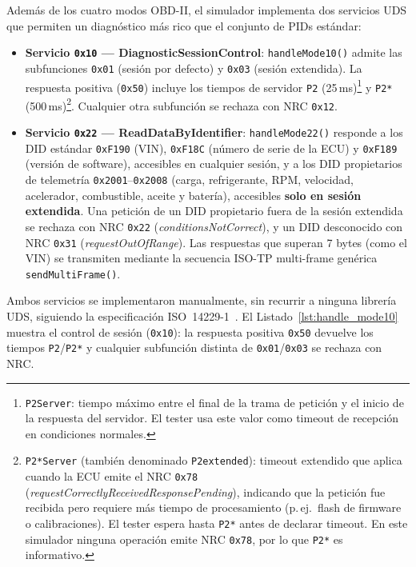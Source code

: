 Además de los cuatro modos OBD-II, el simulador implementa dos servicios UDS que permiten un diagnóstico más rico que el conjunto de PIDs estándar:

\begin{itemize}
    \item \textbf{Servicio \texttt{0x10} — DiagnosticSessionControl}: \texttt{handleMode10()} admite las subfunciones \texttt{0x01} (sesión por defecto) y \texttt{0x03} (sesión extendida). La respuesta positiva (\texttt{0x50}) incluye los tiempos de servidor \texttt{P2} (25\,ms)\footnote{\texttt{P2Server}: tiempo máximo entre el final de la trama de petición y el inicio de la respuesta del servidor. El tester usa este valor como timeout de recepción en condiciones normales.} y \texttt{P2*} (500\,ms)\footnote{\texttt{P2*Server} (también denominado \texttt{P2extended}): timeout extendido que aplica cuando la ECU emite el NRC \texttt{0x78} (\textit{requestCorrectlyReceivedResponsePending}), indicando que la petición fue recibida pero requiere más tiempo de procesamiento (p.\,ej.\ flash de firmware o calibraciones). El tester espera hasta \texttt{P2*} antes de declarar timeout. En este simulador ninguna operación emite NRC \texttt{0x78}, por lo que \texttt{P2*} es informativo.}. Cualquier otra subfunción se rechaza con NRC \texttt{0x12}.

    \item \textbf{Servicio \texttt{0x22} — ReadDataByIdentifier}: \texttt{handleMode22()} responde a los DID estándar \texttt{0xF190} (VIN), \texttt{0xF18C} (número de serie de la ECU) y \texttt{0xF189} (versión de software), accesibles en cualquier sesión, y a los DID propietarios de telemetría \texttt{0x2001}--\texttt{0x2008} (carga, refrigerante, RPM, velocidad, acelerador, combustible, aceite y batería), accesibles \textbf{solo en sesión extendida}. Una petición de un DID propietario fuera de la sesión extendida se rechaza con NRC \texttt{0x22} (\textit{conditionsNotCorrect}), y un DID desconocido con NRC \texttt{0x31} (\textit{requestOutOfRange}). Las respuestas que superan 7 bytes (como el VIN) se transmiten mediante la secuencia ISO-TP multi-frame genérica \texttt{sendMultiFrame()}.
\end{itemize}

Ambos servicios se implementaron manualmente, sin recurrir a ninguna librería UDS, siguiendo la especificación ISO~14229-1~\cite{ISO14229-1:2020}. El Listado~\ref{lst:handle_mode10} muestra el control de sesión (\texttt{0x10}): la respuesta positiva \texttt{0x50} devuelve los tiempos \texttt{P2}/\texttt{P2*} y cualquier subfunción distinta de \texttt{0x01}/\texttt{0x03} se rechaza con NRC.

